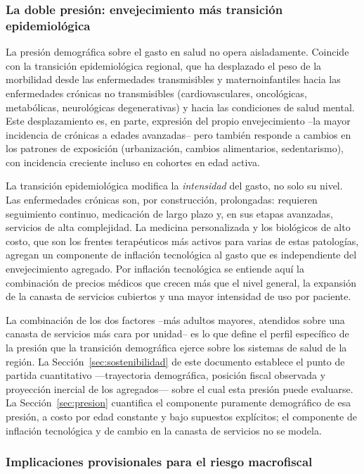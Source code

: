 \documentclass[12pt, letterpaper]{article}
\begin{document}
\subsubsection{La doble presión: envejecimiento más transición epidemiológica}

La presión demográfica sobre el gasto en salud no opera aisladamente. Coincide
con la transición epidemiológica regional, que ha desplazado el peso de la
morbilidad desde las enfermedades transmisibles y maternoinfantiles hacia las
enfermedades crónicas no transmisibles (cardiovasculares, oncológicas,
metabólicas, neurológicas degenerativas) y hacia las condiciones de salud mental.
Este desplazamiento es, en parte, expresión del propio envejecimiento --la mayor
incidencia de crónicas a edades avanzadas-- pero también responde a cambios en
los patrones de exposición (urbanización, cambios alimentarios, sedentarismo),
con incidencia creciente incluso en cohortes en edad activa.

La transición epidemiológica modifica la \textit{intensidad} del gasto, no solo su
nivel. Las enfermedades crónicas son, por construcción, prolongadas: requieren
seguimiento continuo, medicación de largo plazo y, en sus etapas avanzadas,
servicios de alta complejidad. La medicina personalizada y los biológicos de alto
costo, que son los frentes terapéuticos más activos para varias de estas
patologías, agregan un componente de inflación tecnológica al gasto que es
independiente del envejecimiento agregado. Por inflación tecnológica se entiende
aquí la combinación de precios médicos que crecen más que el nivel general, la
expansión de la canasta de servicios cubiertos y una mayor intensidad de uso por
paciente.

La combinación de los dos factores --más adultos mayores, atendidos sobre una
canasta de servicios más cara por unidad-- es lo que define el perfil específico
de la presión que la transición demográfica ejerce sobre los sistemas de salud de
la región. La Sección~\ref{sec:sostenibilidad} de este documento establece el punto
de partida cuantitativo ---trayectoria demográfica, posición fiscal observada y
proyección inercial de los agregados--- sobre el cual esta presión puede evaluarse.
La Sección~\ref{sec:presion} cuantifica el componente puramente demográfico de esa
presión, a costo por edad constante y bajo supuestos explícitos; el componente de
inflación tecnológica y de cambio en la canasta de servicios no se modela.

\subsubsection{Implicaciones provisionales para el riesgo macrofiscal}
\end{document}
